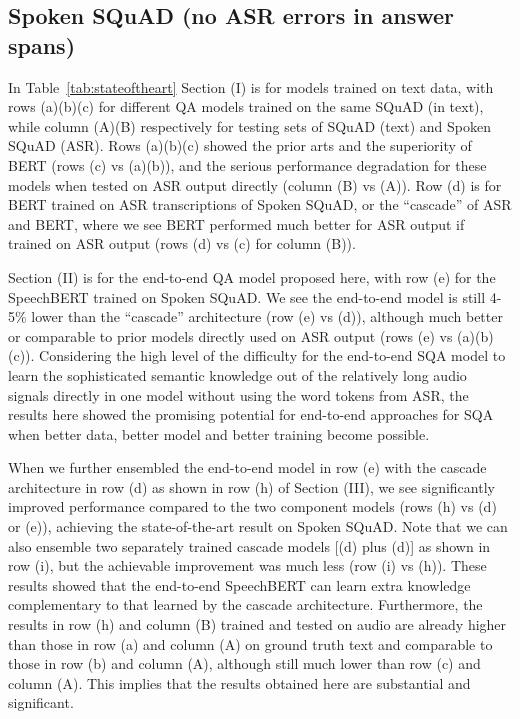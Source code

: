 \documentclass[a4paper]{article}
\begin{document}
\subsection{Spoken SQuAD (no ASR errors in answer spans)}
\vspace{-5pt}

In Table~\ref{tab:stateoftheart} Section (I) is for models trained on text data, with rows (a)(b)(c) for different QA models trained on the same SQuAD (in text), while column (A)(B) respectively for testing sets of SQuAD (text) and Spoken SQuAD (ASR). Rows (a)(b)(c) showed the prior arts and the superiority of BERT (rows (c) vs (a)(b)), and the serious performance degradation for these models when tested on ASR output directly (column (B) vs (A)). Row (d) is for BERT trained on ASR transcriptions of Spoken SQuAD, or the ``cascade'' of ASR and BERT, where we see BERT performed much better for ASR output if trained on ASR output (rows (d) vs (c) for column (B)).

Section (II) is for the end-to-end QA model proposed here, with row (e) for the SpeechBERT trained on Spoken SQuAD. We see the end-to-end model is still 4-5\% lower than the ``cascade'' architecture (row (e) vs (d)), although much better or comparable to prior models directly used on ASR output (rows (e) vs (a)(b)(c)). Considering the high level of the difficulty for the end-to-end SQA model to learn the sophisticated semantic knowledge out of the relatively long audio signals directly in one model without using the word tokens from ASR, the results here showed the promising potential for end-to-end approaches for SQA when better data, better model and better training become possible.

When we further ensembled the end-to-end model in row (e) with the cascade architecture in row (d) as shown in row (h) of Section (III), we see significantly improved performance compared to the two component models (rows (h) vs (d) or (e)), achieving the state-of-the-art result on Spoken SQuAD. Note that we can also ensemble two separately trained cascade models [(d) plus (d)] as shown in row (i), but the achievable improvement was much less (row (i) vs (h)). These results showed that the end-to-end SpeechBERT can learn extra knowledge complementary to that learned by the cascade architecture. Furthermore, the results in row (h) and column (B) trained and tested on audio are already higher than those  in row (a) and column (A) on ground truth text and comparable to those in row (b) and column (A), although still much lower than row (c) and column (A). This implies that the results obtained here are substantial and significant.
\end{document}

